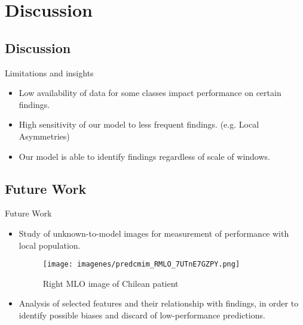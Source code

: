 \section{Discussion}
\subsection{Discussion}
\begin{frame}{Limitations and insights}
    \begin{itemize}
        \item Low availability of data for some classes impact performance on certain findings.
        \item High sensitivity of our model to less frequent findings. (e.g. Local Asymmetries)
        \item Our model is able to identify findings regardless of scale of windows.
    \end{itemize}
\end{frame}


\subsection{Future Work}
\begin{frame}{Future Work}
    \begin{itemize}
        \item Study of unknown-to-model images for measurement of performance with local population.
        
        \begin{figure}
            \centering
            \texttt{[image: imagenes/predcmim\_RMLO\_7UTnE7GZPY.png]}
            \caption{Right MLO image of Chilean patient}
        \end{figure}

        \item Analysis of selected features and their relationship with findings, in order to identify possible biases and discard of low-performance predictions.
    \end{itemize}
\end{frame}
